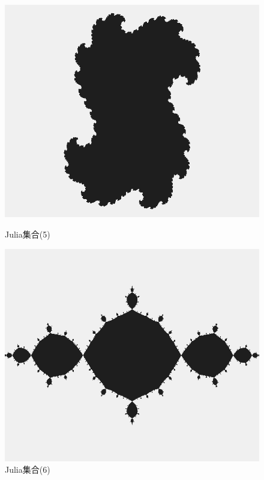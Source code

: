 \documentclass[dvipdfmx]{jsarticle}
\theoremstyle{definition}
\begin{document}
\begin{figure}[ht]
\begin{minipage}{0.5\hsize}
    \begin{center}
        \includegraphics[scale=0.21]{figure/julia_set5.png}
    \end{center}
    \caption{Julia集合(5)}
\end{minipage}
\begin{minipage}{0.49\hsize}
    \begin{center}
        \includegraphics[scale=0.21]{figure/julia_set6.png}
    \end{center}
    \caption{Julia集合(6)}
\end{minipage}
\end{figure}
\end{document}
